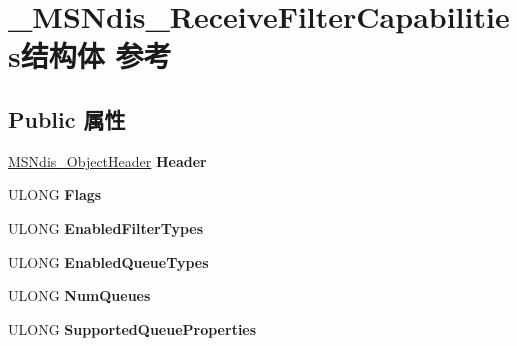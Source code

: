 \hypertarget{struct___m_s_ndis___receive_filter_capabilities}{}\section{\+\_\+\+M\+S\+Ndis\+\_\+\+Receive\+Filter\+Capabilities结构体 参考}
\label{struct___m_s_ndis___receive_filter_capabilities}
\subsection*{Public 属性}
\begin{DoxyCompactItemize}
\item 
\mbox{\label{struct___m_s_ndis___receive_filter_capabilities_aa76450b5e08eba0ce740f2766dc4b954}} 
\hyperlink{struct___m_s_ndis___object_header}{M\+S\+Ndis\+\_\+\+Object\+Header} {\bfseries Header}
\item 
\mbox{\label{struct___m_s_ndis___receive_filter_capabilities_a9a30f7f613ffb9b74931b3af9553ebe6}} 
U\+L\+O\+NG {\bfseries Flags}
\item 
\mbox{\label{struct___m_s_ndis___receive_filter_capabilities_a4a988ae8a0da59999ecae072fb059c2d}} 
U\+L\+O\+NG {\bfseries Enabled\+Filter\+Types}
\item 
\mbox{\label{struct___m_s_ndis___receive_filter_capabilities_a638a4784b6a644af69b64019100faaa4}} 
U\+L\+O\+NG {\bfseries Enabled\+Queue\+Types}
\item 
\mbox{\label{struct___m_s_ndis___receive_filter_capabilities_af36c47c81fad4b1a27bd20ba7503eca6}} 
U\+L\+O\+NG {\bfseries Num\+Queues}
\item 
\mbox{\label{struct___m_s_ndis___receive_filter_capabilities_a4c463d2aecb47ef3a3112e93a7160cc6}} 
U\+L\+O\+NG {\bfseries Supported\+Queue\+Properties}
\item 
\mbox{\label{struct___m_s_ndis___receive_filter_capabilities_a775d528e89cb0de4c1fcb962a9c559ec}} 

\end{DoxyCompactItemize}
